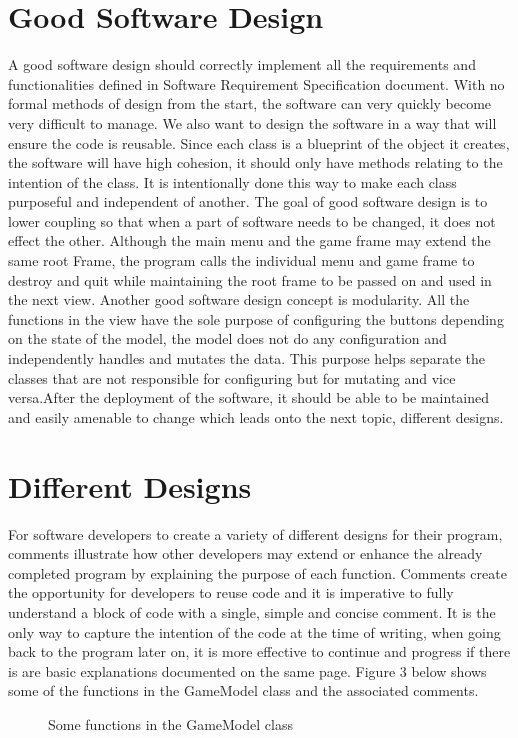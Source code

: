 \documentclass[12pt, a4]{report}
\begin{document}
	\section{Good Software Design}
	\par A good software design should correctly implement all the requirements and functionalities defined in Software Requirement Specification document. With no 
	formal methods of design from the start, the software can very quickly become very difficult to manage. 
	We also want to design the software in a way that will ensure the code is reusable. Since each class is a blueprint of the object it creates, 
	the software will have high cohesion, it should only have methods relating to the intention of the class. It is intentionally done this way to make each 
	class purposeful and independent of another. The goal of good software design is to lower coupling so that when a part of software needs to be changed, it does not effect the other. 
	Although the main menu and the game frame may extend the same root Frame, the program calls the individual menu and game frame to destroy 
	and quit while maintaining the root frame to be passed on and used in the next view. Another good software design concept is modularity. All 
	the functions in the view have the sole purpose of configuring the buttons depending on the state of the model, the model does not do any 
	configuration and independently handles and mutates the data. This purpose helps separate the classes that are not responsible for configuring but 
	for mutating and vice versa.After the deployment of the software, it should be able to be maintained and easily amenable to change which leads onto the 
	next topic, different designs. 
	\newpage
	\section{Different Designs}
	\par For software developers to create a variety of different designs for their program, comments 
	illustrate how other developers may extend or enhance the already completed program by explaining the purpose of 
	each function. Comments create the opportunity for developers to reuse code and it is imperative to fully understand a 
	block of code with a single, simple and concise comment. It is the only way to capture the intention of the code at the time of 
	writing, when going back to the program later on, it is more effective to continue and progress if there is are basic explanations documented 
	on the same page. Figure 3 below shows some of the functions in the GameModel class and the associated comments.
	
	\begin{figure}[h]
		
		\caption{Some functions in the GameModel class}
	\end{figure}
	
	
	
\end{document}
